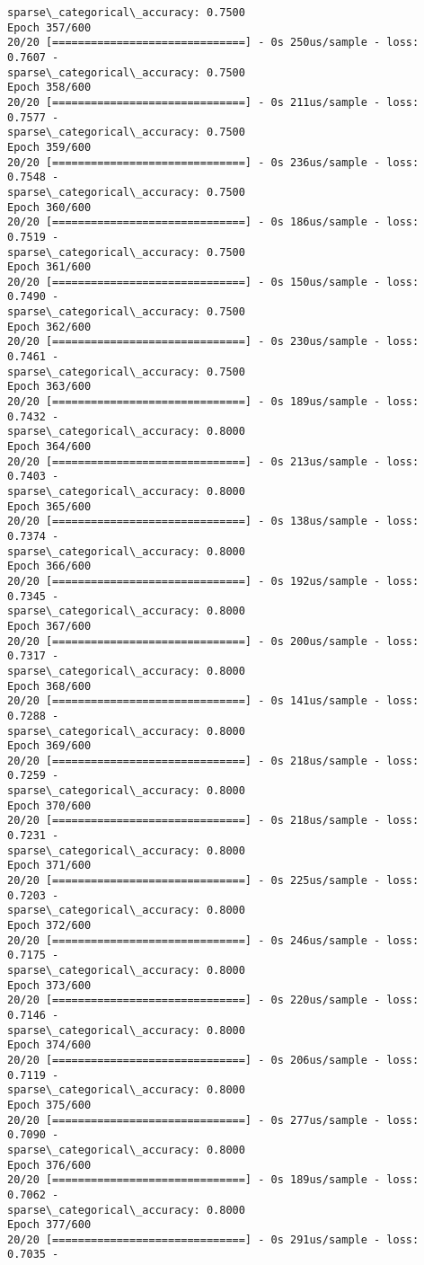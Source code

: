 \documentclass[11pt]{article}
\begin{document}
\begin{Verbatim}[commandchars=\\\{\}]
sparse\_categorical\_accuracy: 0.7500
Epoch 357/600
20/20 [==============================] - 0s 250us/sample - loss: 0.7607 -
sparse\_categorical\_accuracy: 0.7500
Epoch 358/600
20/20 [==============================] - 0s 211us/sample - loss: 0.7577 -
sparse\_categorical\_accuracy: 0.7500
Epoch 359/600
20/20 [==============================] - 0s 236us/sample - loss: 0.7548 -
sparse\_categorical\_accuracy: 0.7500
Epoch 360/600
20/20 [==============================] - 0s 186us/sample - loss: 0.7519 -
sparse\_categorical\_accuracy: 0.7500
Epoch 361/600
20/20 [==============================] - 0s 150us/sample - loss: 0.7490 -
sparse\_categorical\_accuracy: 0.7500
Epoch 362/600
20/20 [==============================] - 0s 230us/sample - loss: 0.7461 -
sparse\_categorical\_accuracy: 0.7500
Epoch 363/600
20/20 [==============================] - 0s 189us/sample - loss: 0.7432 -
sparse\_categorical\_accuracy: 0.8000
Epoch 364/600
20/20 [==============================] - 0s 213us/sample - loss: 0.7403 -
sparse\_categorical\_accuracy: 0.8000
Epoch 365/600
20/20 [==============================] - 0s 138us/sample - loss: 0.7374 -
sparse\_categorical\_accuracy: 0.8000
Epoch 366/600
20/20 [==============================] - 0s 192us/sample - loss: 0.7345 -
sparse\_categorical\_accuracy: 0.8000
Epoch 367/600
20/20 [==============================] - 0s 200us/sample - loss: 0.7317 -
sparse\_categorical\_accuracy: 0.8000
Epoch 368/600
20/20 [==============================] - 0s 141us/sample - loss: 0.7288 -
sparse\_categorical\_accuracy: 0.8000
Epoch 369/600
20/20 [==============================] - 0s 218us/sample - loss: 0.7259 -
sparse\_categorical\_accuracy: 0.8000
Epoch 370/600
20/20 [==============================] - 0s 218us/sample - loss: 0.7231 -
sparse\_categorical\_accuracy: 0.8000
Epoch 371/600
20/20 [==============================] - 0s 225us/sample - loss: 0.7203 -
sparse\_categorical\_accuracy: 0.8000
Epoch 372/600
20/20 [==============================] - 0s 246us/sample - loss: 0.7175 -
sparse\_categorical\_accuracy: 0.8000
Epoch 373/600
20/20 [==============================] - 0s 220us/sample - loss: 0.7146 -
sparse\_categorical\_accuracy: 0.8000
Epoch 374/600
20/20 [==============================] - 0s 206us/sample - loss: 0.7119 -
sparse\_categorical\_accuracy: 0.8000
Epoch 375/600
20/20 [==============================] - 0s 277us/sample - loss: 0.7090 -
sparse\_categorical\_accuracy: 0.8000
Epoch 376/600
20/20 [==============================] - 0s 189us/sample - loss: 0.7062 -
sparse\_categorical\_accuracy: 0.8000
Epoch 377/600
20/20 [==============================] - 0s 291us/sample - loss: 0.7035 -

\end{Verbatim}
\end{document}
